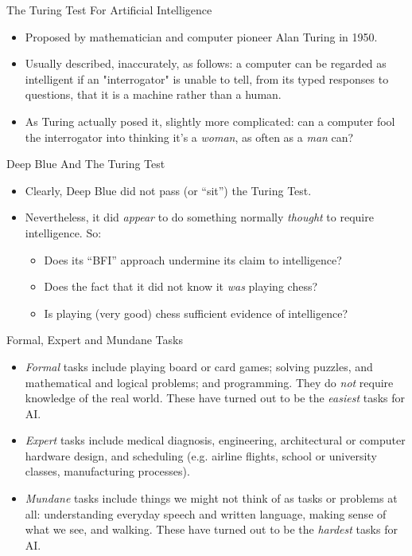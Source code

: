 \documentclass{article}
\begin{document}
\begin{slide}{}
{\Large The Turing Test For Artificial Intelligence}
\begin{itemize}
\item Proposed by mathematician and computer pioneer Alan Turing in 1950.
\item Usually described, inaccurately, as follows: a computer can be
regarded as intelligent if an "interrogator" is unable to tell, from
its typed responses to questions, that it is a machine rather than a
human. 
\item As Turing actually posed it, slightly more complicated: can a
computer fool the interrogator into thinking it's a {\em woman}, as often as
a {\em man} can?

\end{itemize}
\end{slide}

\begin{slide}{}
{\Large Deep Blue And The Turing Test}
\begin{itemize}
\item Clearly, Deep Blue did not pass (or ``sit'') the Turing Test.
\item Nevertheless, it did {\em appear} to do something normally
{\em thought} to require intelligence. So:
\begin{itemize}
\item Does its ``BFI'' approach undermine its claim to intelligence?
\item Does the fact that it did not know it {\em was} playing chess?
\item Is playing (very good) chess sufficient evidence of intelligence?
\end{itemize}
\end{itemize}
\end{slide}

\begin{slide}
{\Large Formal, Expert and Mundane Tasks}
\begin{itemize}
\item {\em Formal} tasks include playing board or card games; solving
puzzles, and mathematical and logical problems; and programming. They
do {\em not} require knowledge of the real world. These have turned
out to be the {\em easiest} tasks for AI.
\item {\em Expert} tasks include medical diagnosis, engineering,
architectural or computer hardware design, and scheduling
(e.g. airline flights, school or university classes, manufacturing
processes).
\item {\em Mundane} tasks include things we might not think of as
tasks or problems at all: understanding everyday speech and written
language, making sense of what we see, and walking. These have turned
out to be the {\em hardest} tasks for AI.
\end{itemize}
\end{slide}
\end{document}
